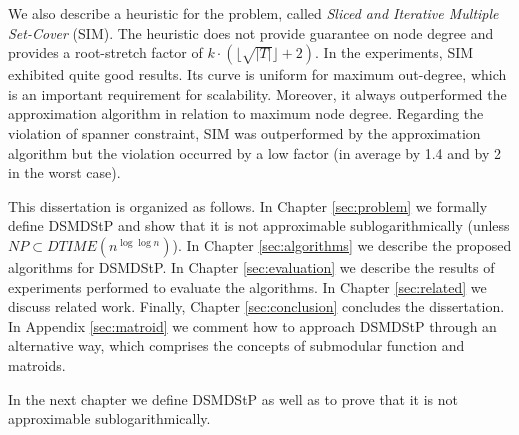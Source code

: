 We also describe a heuristic for the problem, called \emph{Sliced and Iterative Multiple Set-Cover} (SIM). The heuristic does not provide guarantee on node degree and 
provides a root-stretch factor of $k \cdot (\lfloor\sqrt{|T|}\rfloor+2)$. In the experiments, SIM exhibited quite good results. Its curve is uniform for 
maximum out-degree, which is an important requirement for scalability. Moreover, it always outperformed the approximation algorithm 
in relation to maximum node degree. Regarding the violation of spanner constraint, SIM was outperformed by the approximation algorithm but the violation 
occurred by a low factor (in average by 1.4 and by 2 in the worst case).



This dissertation is organized as follows.
In Chapter \ref{sec:problem} we formally define \mbox{DSMDStP} and show that it is not approximable sublogarithmically (unless $NP \subset DTIME(n^{\log \log{n}})$).
In Chapter \ref{sec:algorithms} we describe the proposed algorithms for DSMDStP. 
In Chapter \ref{sec:evaluation} we describe the results of experiments performed to evaluate the algorithms. 
In Chapter \ref{sec:related} we discuss related work. %
Finally, Chapter \ref{sec:conclusion} concludes the dissertation. 
In Appendix \ref{sec:matroid} we comment how to approach DSMDStP through an alternative way, 
which comprises the concepts of submodular function and matroids.    

In the next chapter we define DSMDStP as well as to prove that it is not approximable sublogarithmically.
